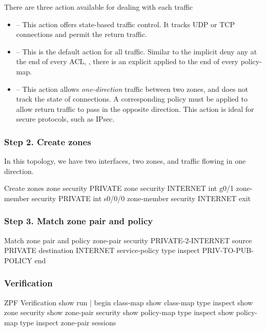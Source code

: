 There are three action available for dealing with each traffic

\begin{itemize}
\item {} -- This action offers state-based traffic control. It tracks UDP or TCP connections and permit the return traffic.
\item {} -- This is the default action for all traffic. Similar to the implicit deny any at the end of every ACL, , there is an explicit  applied to the end of every policy-map.
\item {} -- This action allows \emph{one-direction} traffic between two zones, and does not track the state of connections. A corresponding policy must be applied to allow return traffic to pass in the opposite direction. This action is ideal for secure protocols, such as IPsec. 
\end{itemize}

\subsubsection{Step 2. Create zones}
In this topology, we have two interfaces, two zones, and traffic flowing in one direction.
\begin{sexylisting}{Create zones}
zone security PRIVATE
zone security INTERNET
int g0/1
  zone-member security PRIVATE
int s0/0/0
  zone-member security INTERNET    
exit
\end{sexylisting}



\subsubsection{Step 3. Match zone pair and policy}
\begin{sexylisting}{Match zone pair and policy}
zone-pair security PRIVATE-2-INTERNET source PRIVATE destination INTERNET
  service-policy type inspect  PRIV-TO-PUB-POLICY
end
\end{sexylisting}



\subsubsection{Verification}

\begin{sexylisting}{ZPF Verification}
show run | begin class-map
show class-map type inspect
show zone security
show zone-pair security
show policy-map type inspect
show policy-map type inspect zone-pair sessions
\end{sexylisting}


